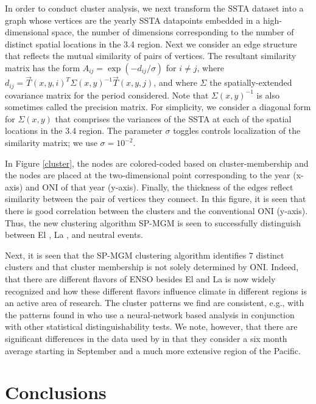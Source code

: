 \documentclass[10pt,journal,compsoc]{IEEEtran} %
\theoremstyle{definition}
\newcommand{\nino}{\text{Ni\~{n}o }}
\newcommand{\nina}{\text{Ni\~{n}a }}
\begin{document}
In order to conduct cluster analysis, we next transform the SSTA
dataset into a graph whose vertices are the yearly SSTA datapoints
embedded in a high-dimensional space, the number of dimensions
corresponding to the number of distinct spatial locations in the \nino
3.4 region. Next we consider an edge structure that reflects the
mutual similarity of pairs of vertices. The resultant similarity
matrix has the form $A_{ij} = \exp(-d_{ij}/\sigma)$ for $i\neq j$,
where $d_{ij} = \vec T(x, y, i)^T\Sigma(x,y)^{-1}\vec T(x, y, j)$, and
where $\Sigma$ the spatially-extended covariance matrix for the period
considered. Note that $\Sigma(x,y)^{-1}$ is also sometimes called the
precision matrix. For simplicity, we consider a diagonal form for
$\Sigma(x,y)$ that comprises the variances of the SSTA at each of
the spatial locations in the \nino 3.4 region.  The parameter $\sigma$
toggles controls localization of the similarity matrix; we use
$\sigma=10^{-2}$.

In Figure \ref{cluster}, the nodes are colored-coded based on
cluster-membership and the nodes are placed at the two-dimensional
point corresponding to the year (x-axis) and ONI of that year
(y-axis). Finally, the thickness of the edges reflect similarity
between the pair of vertices they connect. In this figure, it is seen
that there is good correlation between the clusters and the
conventional ONI (y-axis).  Thus, the new clustering algorithm SP-MGM
is seen to successfully distinguish between El \nino, La \nina, and
neutral events.

Next, it is seen that the SP-MGM clustering algorithm identifies $7$
distinct clusters and that cluster membership is not solely determined
by ONI. Indeed, that there are different flavors of ENSO
besides El \nino and La \nina is now widely recognized and how these
different flavors influence climate in different regions is an
active area of research.  The cluster patterns we find are consistent,
e.g., with the patterns found in \cite{johnson2013many} who use a
neural-network based analysis in conjunction with other statistical
distinguishability tests. We note, however, that there are significant
differences in the data used by \cite{johnson2013many} in that they
consider a six month average starting in September and a much more
extensive region of the Pacific.


\section{Conclusions} 
\end{document}
